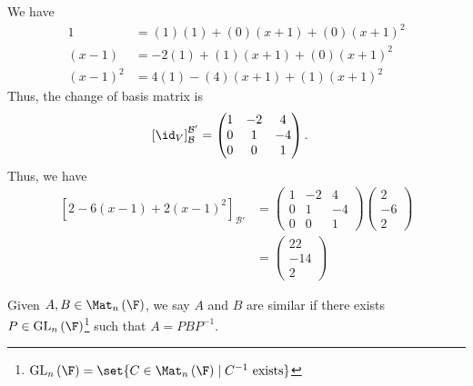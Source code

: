 \documentclass[10pt]{mypackage}
\begin{document}
\begin{solution}
  We have
  \begin{align*}
    1 &= (1)(1) + (0)\left(x+1\right) + (0)\left(x+1\right)^2\\
    \left(x-1\right) &= -2\left(1\right) + (1)\left(x+1\right) + \left(0\right)\left(x+1\right)^2\\
    \left(x-1\right)^2 &=  4(1) -(4)\left(x+1\right) + (1)\left(x+1\right)^2
  \end{align*}
  Thus, the change of basis matrix is
  \begin{align*}
    \left[\id_{V}\right]_{\mathcal{B}}^{\mathcal{B}'} &= \begin{pmatrix}1 & -2 & 4 \\ 0 & 1 & -4 \\ 0 & 0 & 1\end{pmatrix}.
  \end{align*}
  Thus, we have
  \begin{align*}
    \left[2 - 6\left(x-1\right) + 2\left(x-1\right)^2\right]_{\mathcal{B}'} &= \begin{pmatrix}1 & -2 & 4\\ 0 & 1 & -4 \\ 0 & 0 & 1\end{pmatrix} \begin{pmatrix}2\\-6\\2\end{pmatrix}\\
                                                                            &= \begin{pmatrix}22\\-14\\2\end{pmatrix}
  \end{align*}
\end{solution}
\begin{definition}
  Given $A,B\in \Mat_{n}\left(\F\right)$, we say $A$ and $B$ are similar if there exists $P\in \text{GL}_{n}\left(\F\right)$\footnote{$\text{GL}_{n}\left(\F\right) = \set{C\in \Mat_{n}\left(\F\right)\mid C^{-1}\text{ exists}}$} such that $A = PBP^{-1}$.
\end{definition}
\end{document}
